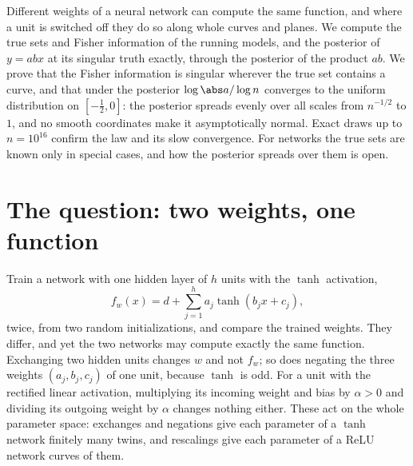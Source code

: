 \begin{refsection}

\begin{chaptersummary}
Different weights of a neural network can compute the same function, and where a unit is switched off they do so along whole curves and planes. We compute the true sets and Fisher information of the running models, and the posterior of $y=abx$ at its singular truth exactly, through the posterior of the product $ab$. We prove that the Fisher information is singular wherever the true set contains a curve, and that under the posterior $\log\abs a/\log n$ converges to the uniform distribution on $[-\frac12,0]$: the posterior spreads evenly over all scales from $n^{-1/2}$ to $1$, and no smooth coordinates make it asymptotically normal. Exact draws up to $n=10^{16}$ confirm the law and its slow convergence. For networks the true sets are known only in special cases, and how the posterior spreads over them is open.
\end{chaptersummary}

\section{The question: two weights, one function}\label{sec:singular:question}

Train a network with one hidden layer of $h$ units with the $\tanh$ activation,
\begin{equation}\label{eq:singular:net}
f_w(x)=d+\sum_{j=1}^h a_j\tanh(b_jx+c_j),
\end{equation}
twice, from two random initializations, and compare the trained weights. They differ, and yet the two networks may compute exactly the same function. Exchanging two hidden units changes $w$ and not $f_w$; so does negating the three weights $(a_j,b_j,c_j)$ of one unit, because $\tanh$ is odd. For a unit with the rectified linear activation, multiplying its incoming weight and bias by $\alpha>0$ and dividing its outgoing weight by $\alpha$ changes nothing either. These  act on the whole parameter space: exchanges and negations give each parameter of a $\tanh$ network finitely many twins, and rescalings give each parameter of a ReLU network curves of them.


\end{refsection}
